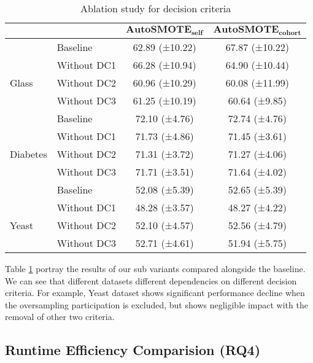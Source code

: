   \begin{table}[H]
    \centering
    \caption{Ablation study for decision criteria}
    \begin{tabular}{llcc}
        \toprule
        & & $\mathbf{AutoSMOTE_{self}}$ & $\mathbf{AutoSMOTE_{cohort}}$ \\
        \midrule
        & Baseline & 62.89 (±10.22) &  67.87 (±10.22) \\
        \multirow{3}{*}{Glass} & Without DC1 & 66.28 (±10.94) & 64.90 (±10.44) \\
                               & Without DC2 & 60.96 (±10.29) & 60.08 (±11.99) \\
                               & Without DC3 & 61.25 (±10.19) & 60.64 (±9.85) \\
        \midrule
        & Baseline & 72.10 (±4.76) & 72.74 (±4.76) \\
        \multirow{3}{*}{Diabetes} & Without DC1 & 71.73 (±4.86) & 71.45 (±3.61) \\
                                  & Without DC2 & 71.31 (±3.72) & 71.27 (±4.06) \\
                                  & Without DC3 & 71.71 (±3.51) & 71.64 (±4.02) \\
        \midrule
        & Baseline & 52.08 (±5.39) & 52.65 (±5.39) \\
        \multirow{3}{*}{Yeast} & Without DC1 & 48.28 (±3.57) & 48.27 (±4.22) \\
                               & Without DC2 & 52.10 (±4.57) & 52.56 (±4.79) \\
                               & Without DC3 & 52.71 (±4.61) & 51.94 (±5.75) \\
        \bottomrule
    \end{tabular}
    \label{table:ablation}
\end{table}

  Table \ref{table:ablation} portray the results
of our sub variants compared alongside the baseline. We can see that different datasets different dependencies on different decision criteria. For example, Yeast dataset shows significant performance decline when the oversampling participation is excluded, but shows negligible impact with the removal of other two criteria.




\subsection{Runtime Efficiency Comparision (RQ4)}



